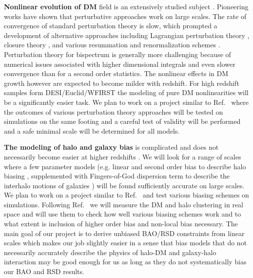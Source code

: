 \textbf{Nonlinear evolution of DM} field is an extensively studied subject
\cite{1981MNRAS.197..931J,1983MNRAS.203..345V,1986ApJ...311....6G,1992PhRvD..46..585M,1994ApJ...431..495J}.
Pioneering works have shown that perturbative approaches work on large scales.
The rate of convergence of standard perturbation theory is slow, which
prompted a development of alternative approaches including Lagrangian
perturbation theory
\cite{1992MNRAS.254..729B,1993MNRAS.264..375B,1994MNRAS.267..811B,1995A&A...296..575B},
closure theory
\cite{2007PhRvD..75d3514M,2008ApJ...674..617T,2008JCAP...10..036P}, and various
resummation and renormalization schemes
\cite{2006PhRvD..73f3519C,2006PhRvD..73f3520C,2008PhRvD..77b3533C}.
Perturbation theory for bispectrum is generally more challenging because of
numerical issues associated with higher dimensional integrals and even slower
convergence than for a second order statistics. The nonlinear effects in DM
growth however are expected to become milder with redshift. For high redshift
samples form DESI/Euclid/WFIRST the modeling of pure DM nonlinearities will be
a significantly easier task. We plan to work on a project similar to
Ref.~\cite{2009PhRvD..80d3531C} where the outcomes of various perturbation
theory approaches will be tested on simulations on the same footing and a
careful test of validity will be performed and a safe minimal scale will be
determined for all models.

\textbf{The modeling of halo and galaxy bias} is complicated and does not
necessarily become easier at higher redshifts \cite{2018PhR...733....1D}. We
will look for a range of scales where a few parameter models (e.g.  linear and
second order bias to describe halo biasing
\cite{1993ApJ...413..447F,2012PhRvD..85h3509C,2012PhRvD..86h3540B}, supplemented
with Fingers-of-God dispersion term to describe the interhalo motions of
galaxies \cite{1972MNRAS.156P...1J,2005ApJ...630....1Z,2016MNRAS.455L..77H})
will be found sufficiently accurate on large scales. We plan to work on a
project similar to Ref.~\cite{2009ApJ...691..569J} and test various biasing
schemes on simulations.  Following Ref.~\cite{2009ApJ...691..569J} we will
measure the DM and halo clustering in real space and will use them to check how
well various biasing schemes work and to what extent is inclusion of higher
order bias and non-local bias necessary. The main goal of our project is to
derive unbiased BAO/RSD constraints from linear scales which makes our job
slightly easier in a sense that bias models that do not necessarily accurately
describe the physics of halo-DM and galaxy-halo interaction may be good enough
for us as long as they do not systematically bias our BAO and RSD results.

